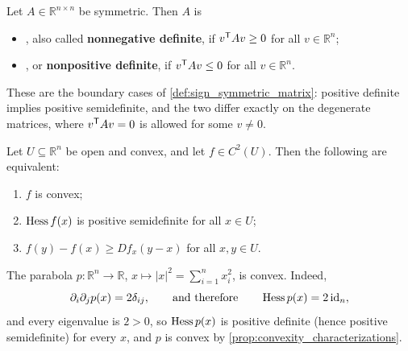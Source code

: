 \begin{definition}
\label{def:semidefinite_matrix}
Let $A \in \mathbb{R}^{n\times n}$ be symmetric. Then $A$ is
\begin{itemize}
  \item {} , also called
    \textbf{nonnegative definite}, if $v^{\mathsf{T}} Av \geq 0$ for all $v \in \mathbb{R}^n$;
  \item {} , or
    \textbf{nonpositive definite}, if $v^{\mathsf{T}} Av \leq 0$ for all $v \in \mathbb{R}^n$.
\end{itemize}
These are the boundary cases of \cref{def:sign_symmetric_matrix}: positive definite implies
positive semidefinite, and the two differ exactly on the degenerate matrices, where
$v^{\mathsf{T}} Av = 0$ is allowed for some $v \neq 0$.
\end{definition}


\begin{proposition}
\label{prop:convexity_characterizations}
Let $U \subseteq \mathbb{R}^n$ be open and convex, and let $f \in C^2(U)$. Then the following are
equivalent:
\begin{enumerate}[label=\textbf{(\alph*)}]
  \item $f$ is convex;
  \item $\operatorname{Hess} f(x)$ is positive semidefinite for all $x \in U$;
  \item $f(y)-f(x) \geq Df_x(y-x)$ for all $x,y \in U$.
\end{enumerate}
\end{proposition}

\begin{example}
The parabola $p : \mathbb{R}^n \to \mathbb{R}$, $x \mapsto |x|^2 = \sum_{i=1}^n x_i^2$, is convex. Indeed,
\[\partial_i\partial_j p(x) = 2\delta_{ij}, \qquad\text{and therefore}\qquad \operatorname{Hess} p(x) = 2\operatorname{id}_n,\]
and every eigenvalue is $2>0$, so $\operatorname{Hess} p(x)$ is positive definite (hence positive semidefinite)
for every $x$, and $p$ is convex by \cref{prop:convexity_characterizations}.
\end{example}

